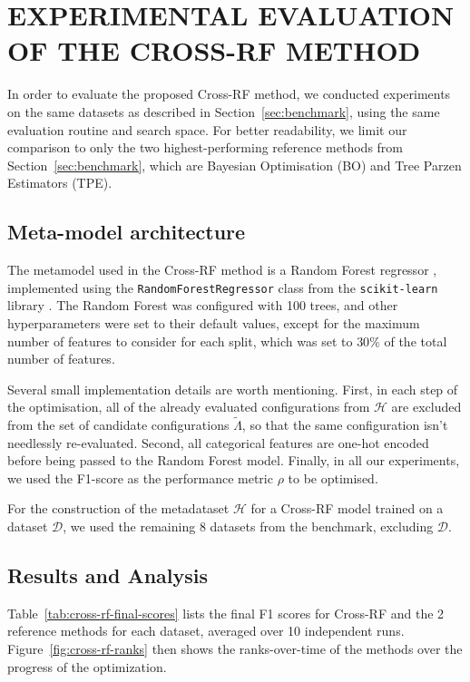 \section{\uppercase{Experimental evaluation of the Cross-RF method}}
\label{sec:experimental-evaluation}

In order to evaluate the proposed Cross-RF method, we conducted experiments on the same datasets as described in Section~\ref{sec:benchmark}, using the same evaluation routine and search space. For better readability, we limit our comparison to only the two highest-performing reference methods from Section~\ref{sec:benchmark}, which are Bayesian Optimisation (BO) and Tree Parzen Estimators (TPE).

\subsection{Meta-model architecture}

The metamodel used in the Cross-RF method is a Random Forest regressor \cite{breiman_random_2001}, implemented using the \texttt{RandomForestRegressor} class from the \texttt{scikit-learn} library \cite{pedregosa_scikit-learn_2011}. The Random Forest was configured with 100 trees, and other hyperparameters were set to their default values, except for the maximum number of features to consider for each split, which was set to \( 30\% \) of the total number of features.

Several small implementation details are worth mentioning. First, in each step of the optimisation, all of the already evaluated configurations from \( \mathcal{H} \) are excluded from the set of candidate configurations \( \tilde{\Lambda} \), so that the same configuration isn't needlessly re-evaluated. Second, all categorical features are one-hot encoded before being passed to the Random Forest model. Finally, in all our experiments, we used the F1-score as the performance metric \( \rho \) to be optimised.

For the construction of the metadataset \( \mathcal{H} \) for a Cross-RF model trained on a dataset \( \mathcal{D} \), we used the remaining 8 datasets from the benchmark, excluding \( \mathcal{D} \).

\subsection{Results and Analysis}
Table~\ref{tab:cross-rf-final-scores} lists the final F1 scores for Cross-RF and the 2 reference methods for each dataset, averaged over 10 independent runs. Figure~\ref{fig:cross-rf-ranks} then shows the ranks-over-time of the methods over the progress of the optimization.

